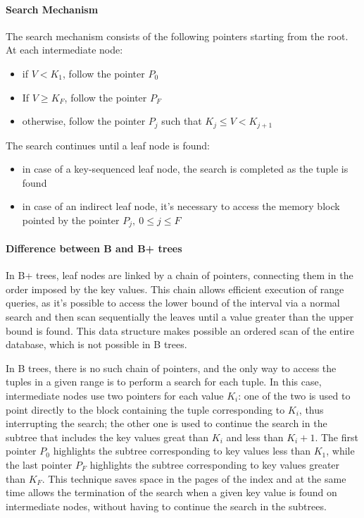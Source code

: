 \documentclass[english]{article}
\begin{document}
\paragraph{Search Mechanism}

The search mechanism consists of the following pointers starting from the root.
At each intermediate node:

\begin{itemize}
  \item if \(V < K_1\), follow the pointer \(P_0\)
  \item If \(V \geq K_F\), follow the pointer \(P_F\)
  \item otherwise, follow the pointer \(P_j\) such that \(K_j \leq V < K_{j + 1}\)
\end{itemize}

The search continues until a leaf node is found:

\begin{itemize}
  \item in case of a key-sequenced leaf node, the search is completed as the tuple is found
  \item in case of an indirect leaf node, it's necessary to access the memory block pointed by the pointer \(P_j, \ 0 \leq j \leq F\)
\end{itemize}

\paragraph{Difference between B and B+ trees}

In B+ trees, leaf nodes are linked by a chain of pointers, connecting them in the order imposed by the key values.
This chain allows efficient execution of range queries, as it's possible to access the lower bound of the interval via a normal search and then scan sequentially the leaves until a value greater than the upper bound is found.
This data structure makes possible an ordered scan of the entire database, which is not possible in B trees.

In B trees, there is no such chain of pointers, and the only way to access the tuples in a given range is to perform a search for each tuple.
In this case, intermediate nodes use two pointers for each value \(K_i\):
one of the two is used to point directly to the block containing the tuple corresponding to \(K_i\), thus interrupting the search;
the other one is used to continue the search in the subtree that includes the key values great than \(K_i\) and less than \(K_i + 1\).
The first pointer \(P_0\) highlights the subtree corresponding to key values less than \(K_1\), while the last pointer \(P_F\) highlights the subtree corresponding to key values greater than \(K_F\).
This technique saves space in the pages of the index and at the same time allows the termination of the search when a given key value is found on intermediate nodes, without having to continue the search in the subtrees.
\end{document}
